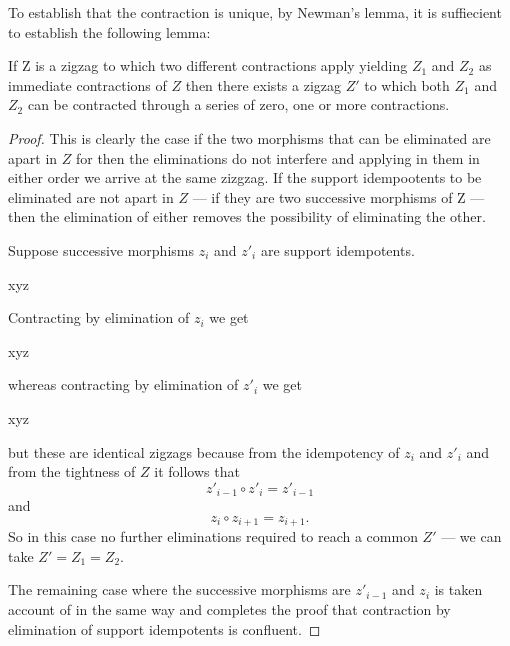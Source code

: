 To establish that the contraction is unique, by Newman's lemma, 
it is suffiecient 
to establish the following lemma:
\begin{lemma}
If Z is a zigzag to which two different contractions apply yielding
$Z_1$ and $Z_2$ as immediate contractions of $Z$ then there exists
a zigzag $Z'$ to which both $Z_1$ and $Z_2$ can be contracted through a series of zero, one or more contractions. 
\end{lemma}
\begin{proof}
This is clearly the case if the two morphisms 
that can be eliminated are apart in $Z$ for then the eliminations do not interfere and applying in them in either order we arrive at the same zizgzag. 
If the support idempootents to be eliminated are not apart in $Z$ 
--- if they are two successive morphisms of Z --- 
then the elimination of either 
removes the possibility of eliminating the other. 

Suppose successive morphisms $z_i$ and $z'_i$ are support idempotents.

\begin{wrappedZigzag}{x}{y}{z}
\arraycolsep=12pt
\end{wrappedZigzag}
Contracting by elimination of $z_i$ we get
\begin{wrappedZigzag}{x}{y}{z}
\arraycolsep=12pt
\end{wrappedZigzag}
whereas contracting by elimination of $z'_i$ we get
\begin{wrappedZigzag}{x}{y}{z}
\arraycolsep=12pt
\end{wrappedZigzag}
but these are identical zigzags 
because from the idempotency of $z_i$ and $z'_i$ 
and from the tightness of $Z$ it follows that
\[
z'_{i-1} \circ z'_i = z'_{i-1}
\]
and
\[
z_i \circ z_{i+1} = z_{i+1}.
\]
So in this case no further eliminations  required 
to reach a common $Z'$ --- we can take  $Z'= Z_1=Z_2$.

The remaining case where the successive morphisms are $z'_{i-1}$ and $z_i$ is taken account of in the same way and completes the proof that contraction by elimination of support idempotents is confluent. 
\end{proof} 


